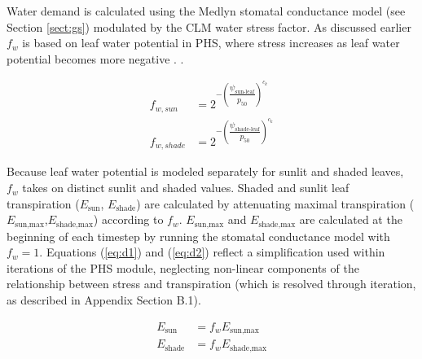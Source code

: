 \documentclass[draft,linenumbers]{agujournal}
\begin{document}
    Water demand is calculated using the Medlyn stomatal conductance model (see Section \ref{sect:gs}) modulated by the CLM water stress factor.
    As discussed earlier $f_w$ is based on leaf water potential in PHS, where stress increases as leaf water potential becomes more negative \citep{klein2014}.
     \citep{anderegg2018}.

    
     \begin{linenomath*}
     \begin{equation}
     \begin{aligned}
     \label{eq:d1}
     f_{w,sun} &= 2^{-\left(\dfrac{\psi_{\text{sun-leaf}}}{p_{50}}\right)^{c_k}} \\
     f_{w,shade} &= 2^{-\left(\dfrac{\psi_{\text{shade-leaf}}}{p_{50}}\right)^{c_k}}
     \end{aligned}     
     \end{equation}
     \end{linenomath*}
     
     Because leaf water potential is modeled separately for sunlit and shaded leaves, $f_w$ takes on distinct sunlit and shaded values.
     Shaded and sunlit leaf transpiration ($E_{\text{sun}}$, $E_{\text{shade}}$) are calculated by attenuating maximal transpiration ($E_{\text{sun,max}}$,$E_{\text{shade,max}}$) according to $f_w$. 
     $E_{\text{sun,max}}$ and $E_{\text{shade,max}}$ are calculated at the beginning of each timestep by running the stomatal conductance model with $f_w=1$.
     Equations (\ref{eq:d1}) and (\ref{eq:d2}) reflect a simplification used within iterations of the PHS module, 
     neglecting non-linear components of the relationship between stress and transpiration (which is resolved through iteration, as described in Appendix Section B.1).
     
     \begin{linenomath*}
     \begin{equation}
     \begin{aligned}
     \label{eq:d2}
     E_{\text{sun}} & = f_wE_{\text{sun,max}} \\
     E_{\text{shade}} & = f_wE_{\text{shade,max}}
     \end{aligned}     
     \end{equation}
     \end{linenomath*}
     
\end{document}
